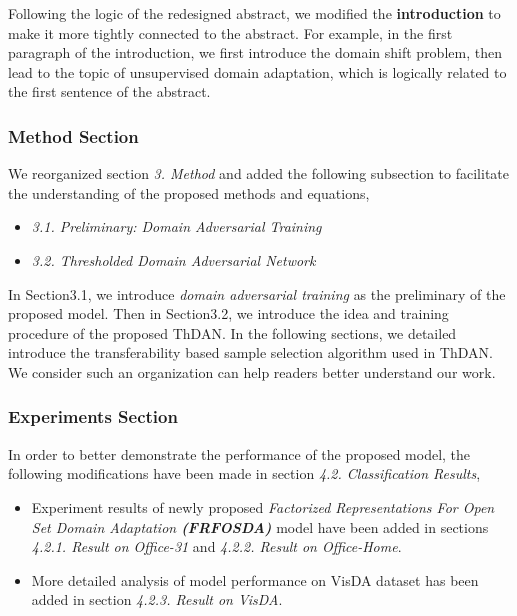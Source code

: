 Following the logic of the redesigned abstract, we modified the \textbf{introduction} to make it more tightly connected to the abstract.
For example, in the first paragraph of the introduction, we first introduce the domain shift problem, then lead to the topic of unsupervised domain adaptation, which is logically related to the first sentence of the abstract. 


\subsubsection*{{\textbf{Method Section}}}

We reorganized section \textit{3. Method} and added the following subsection to facilitate the understanding of the proposed methods and equations,
\begin{itemize}[topsep=0pt]
    \small
    \item \textit{3.1. Preliminary: Domain Adversarial Training} 
    \item \textit{3.2. Thresholded Domain Adversarial Network} 
\end{itemize}
In Section3.1, we introduce \textit{domain adversarial training} \cite{DomainAdversrialNetwork} as the preliminary of the proposed model.
Then in Section3.2, we introduce the idea and training procedure of the proposed ThDAN.
In the following sections, we detailed introduce the transferability based sample selection algorithm used in ThDAN.
We consider such an organization can help readers better understand our work.

\subsubsection*{{\textbf{Experiments Section}}}
In order to better demonstrate the performance of the proposed model, the following modifications have been made in section \textit{4.2. Classification Results},
\begin{itemize}[topsep=0pt]
    \small
    \item Experiment results of newly proposed \textit{Factorized Representations For Open Set Domain Adaptation \textbf{(FRFOSDA)}} model \cite{PDA-fac} have been added in sections \textit{4.2.1. Result on Office-31} and \textit{4.2.2. Result on Office-Home}. 
    \item More detailed analysis of model performance on VisDA dataset has been added in section \textit{4.2.3. Result on VisDA}.
\end{itemize}

